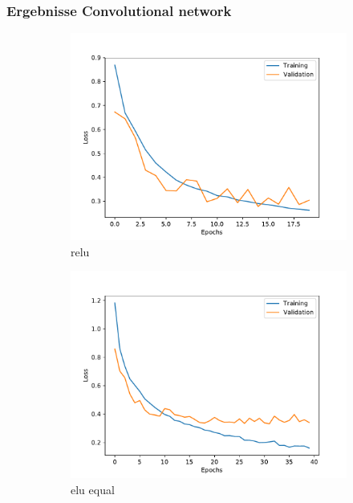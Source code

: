 \documentclass[aspectratio=1610, professionalfonts, 9pt]{beamer}
\begin{document}
\begin{frame}
    \frametitle{Ergebnisse Convolutional network}
    \begin{figure}[H]%
        \begin{subfigure}{0.3\textwidth}%
            \includegraphics[width=1.2\linewidth]{images/loss_history_relu.pdf}%
            \caption{relu}%
        \end{subfigure}%
        \hfill%
        \begin{subfigure}{0.3\textwidth}%
            \includegraphics[width=1.2\linewidth]{images/loss_history_equal.pdf}%
            \caption{elu equal}%
        \end{subfigure}%
        \hfill%
        \begin{subfigure}{0.3\textwidth}%

\end{subfigure}
\end{figure}
\end{frame}
\end{document}
